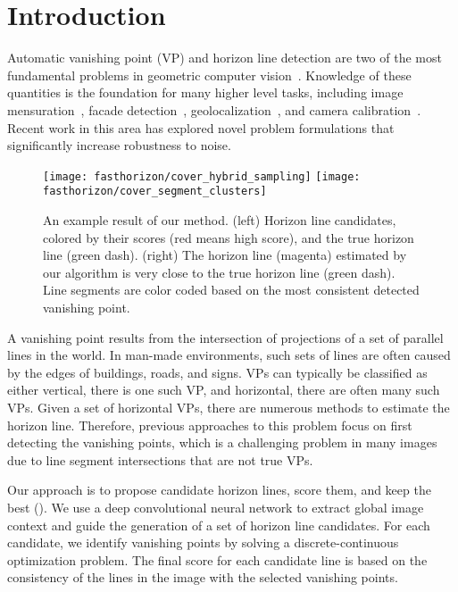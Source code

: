 \section{Introduction}

Automatic vanishing point (VP) and horizon line detection are two of
the most fundamental problems in geometric computer
vision~\cite{barnard1983interpreting,magee1984determining}. Knowledge
of these quantities is the foundation for many higher level
tasks, including image mensuration~\cite{criminisi2000single},
facade detection~\cite{liulocal2014},
geolocalization~\cite{baatz2010handling,workman2014rainbow}, and
camera
calibration~\cite{autorecovery2000,grammatikopoulos2007automatic,
jacobs13cloudcalibration,videocampass2002}. Recent work in this area
\cite{global2013,wildenauer2012,kitware2013} has explored novel
problem formulations that significantly increase robustness to noise.

\begin{figure}
  \centering
  \texttt{[image: fasthorizon/cover\_hybrid\_sampling]}
  \texttt{[image: fasthorizon/cover\_segment\_clusters]}

  \caption{An example result of our method. (left) Horizon line
    candidates, colored by their scores (red means high score), and
    the true horizon line (green dash). (right) The horizon line
    (magenta) estimated by our algorithm is very close to the true
    horizon line (green dash).  Line segments are color coded based on
    the most consistent detected vanishing point.}

  \label{fig:cover}
\end{figure}

A vanishing point results from the intersection of projections of a
set of parallel lines in the world. In man-made environments, such
sets of lines are often caused by the edges of buildings, roads, and
signs. VPs can typically be classified as either vertical, there is
one such VP, and horizontal, there are often many such VPs.  Given a
set of horizontal VPs, there are numerous methods to estimate the
horizon line.  Therefore, previous approaches to this problem focus on
first detecting the vanishing points, which is a challenging problem
in many images due to line segment intersections that are not true
VPs.

Our approach is to propose candidate horizon lines, score them, and
keep the best (). We use a deep convolutional neural network to extract
global image context and guide the generation of a set of horizon line
candidates. For each candidate, we identify vanishing points by
solving a discrete-continuous optimization problem.  The final score for
each candidate line is based on the consistency of the lines in the
image with the selected vanishing points. 


